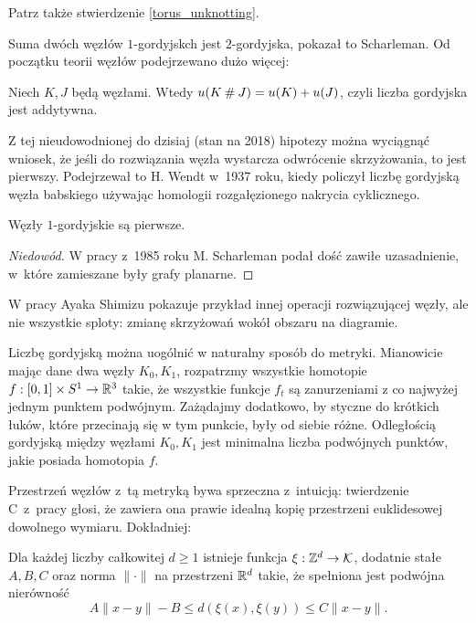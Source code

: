 Patrz także stwierdzenie \ref{torus_unknotting}.

Suma dwóch węzłów $1$-gordyjskch jest $2$-gordyjska, pokazał to Scharleman.
Od początku teorii węzłów podejrzewano dużo więcej:

\begin{conjecture}
    Niech $K, J$ będą węzłami.
    Wtedy $u(K \mathbin{\#} J) = u(K) + u(J)$, czyli liczba gordyjska jest addytywna.
\end{conjecture}

Z tej nieudowodnionej do dzisiaj (stan na 2018) hipotezy można wyciągnąć wniosek,
że jeśli do rozwiązania węzła wystarcza odwrócenie skrzyżowania, to jest pierwszy.
Podejrzewał to H. Wendt w~1937 roku,
kiedy policzył liczbę gordyjską węzła babskiego używając homologii rozgałęzionego nakrycia cyklicznego.

\begin{proposition}
    Węzły $1$-gordyjskie są pierwsze.
\end{proposition}

\begin{proof}[Niedowód]
    W pracy \cite{scharleman85} z~1985 roku M. Scharleman podał dość zawiłe uzasadnienie, w~które zamieszane były grafy planarne.
\end{proof}

W pracy \cite{shimizu14} Ayaka Shimizu pokazuje przykład innej operacji rozwiązującej węzły, ale nie wszystkie sploty:
zmianę skrzyżowań wokół obszaru na diagramie.

Liczbę gordyjską można uogólnić w naturalny sposób do metryki.
Mianowicie mając dane dwa węzły $K_0, K_1$, rozpatrzmy wszystkie homotopie $f : [0,1] \times S^1 \to \mathbb R^3$ takie, że wszystkie funkcje $f_t$ są zanurzeniami z co najwyżej jednym punktem podwójnym.
Zażądajmy dodatkowo, by styczne do krótkich łuków, które przecinają się w tym punkcie, były od siebie różne.
Odległością gordyjską między węzłami $K_0, K_1$ jest minimalna liczba podwójnych punktów, jakie posiada homotopia $f$.

Przestrzeń węzłów z~tą metryką bywa sprzeczna z~intuicją: twierdzenie C~z~pracy \cite{gambaudo05} głosi, że zawiera ona prawie idealną kopię przestrzeni euklidesowej dowolnego wymiaru.
Dokładniej:

\begin{proposition}
    Dla każdej liczby całkowitej $d \ge 1$ istnieje funkcja $\xi: \mathbb Z^d \to \mathcal{K}$, dodatnie stałe $A, B, C$ oraz norma $\|\cdot\|$ na przestrzeni $\mathbb R^d$ takie, że spełniona jest podwójna nierówność
    \[
        A\|x-y\|  - B \le d(\xi(x), \xi(y)) \le C\|x-y\|.
    \]
\end{proposition}

